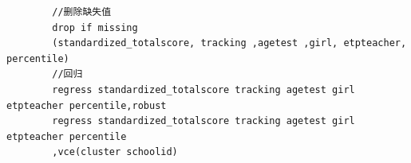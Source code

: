 \documentclass[a4paper]{ctexart}
\theoremstyle{remark}
\begin{document}
\begin{itemize}
\begin{lstlisting}
        //删除缺失值
        drop if missing
        (standardized_totalscore, tracking ,agetest ,girl, etpteacher, percentile)
        //回归
        regress standardized_totalscore tracking agetest girl etpteacher percentile,robust
        regress standardized_totalscore tracking agetest girl etpteacher percentile 
        ,vce(cluster schoolid)
    \end{lstlisting}

\end{itemize}
\end{document}
